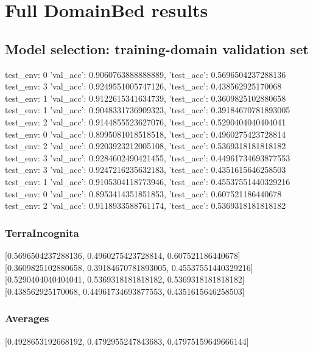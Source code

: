 \documentclass{article}
\begin{document}
\section{Full DomainBed results}

\subsection{Model selection: training-domain validation set}
test_env: 0
{'val_acc': 0.9060763888888889, 'test_acc': 0.5696504237288136}
test_env: 3
{'val_acc': 0.9249551005747126, 'test_acc': 0.438562925170068}
test_env: 1
{'val_acc': 0.9122615341634739, 'test_acc': 0.3609825102880658}
test_env: 1
{'val_acc': 0.9048331736909323, 'test_acc': 0.39184670781893005}
test_env: 2
{'val_acc': 0.9144855523627076, 'test_acc': 0.5290404040404041}
test_env: 0
{'val_acc': 0.8995081018518518, 'test_acc': 0.4960275423728814}
test_env: 2
{'val_acc': 0.9203923212005108, 'test_acc': 0.5369318181818182}
test_env: 3
{'val_acc': 0.9284602490421455, 'test_acc': 0.44961734693877553}
test_env: 3
{'val_acc': 0.9247216235632183, 'test_acc': 0.4351615646258503}
test_env: 1
{'val_acc': 0.9105304118773946, 'test_acc': 0.45537551440329216}
test_env: 0
{'val_acc': 0.8953414351851853, 'test_acc': 0.607521186440678}
test_env: 2
{'val_acc': 0.9118933588761174, 'test_acc': 0.5369318181818182}

\subsubsection{TerraIncognita}
[0.5696504237288136, 0.4960275423728814, 0.607521186440678]
[0.3609825102880658, 0.39184670781893005, 0.45537551440329216]
[0.5290404040404041, 0.5369318181818182, 0.5369318181818182]
[0.438562925170068, 0.44961734693877553, 0.4351615646258503]

\begin{center}
\end{center}

\subsubsection{Averages}
[0.4928653192668192, 0.4792955247843683, 0.47975159649666144]

\begin{center}
\end{center}
\end{document}
